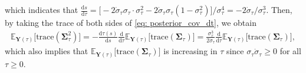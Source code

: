 \documentclass[11pt]{article}
\newcommand{\mE}{\mathbb{E}}
\newcommand{\bY}{\mathbf{Y}}
\newcommand{\bSimga}{\boldsymbol{\Sigma}}
\newcommand{\intd}{\mathrm{d}}
\begin{document}
which indicates that $\frac{\intd s}{\intd \tau} = \big[-2\dot\sigma_\tau\sigma_\tau\cdot \sigma_\tau^2 - 2\dot\sigma_\tau\sigma_\tau(1 - \sigma_\tau^2)\big]/\sigma_\tau^4 = -2\dot\sigma_\tau/\sigma_\tau^3$. Then, by taking the trace of both sides of \eqref{eq: posterior_cov_dt}, we obtain
\begin{align}\label{eq: posterior_cov_trace_dt}
    \mE_{\bY(\tau)}\big[\text{trace}(\bSimga_\tau^2)\big] = -\frac{\intd \tau(s)}{\intd s}\frac{\intd}{\intd \tau}\mE_{\bY(\tau)}\big[\text{trace}(\bSimga_{\tau})\big] = \frac{\sigma_\tau^3}{2\dot\sigma_\tau}\frac{\intd}{\intd \tau}\mE_{\bY(\tau)}\big[\text{trace}(\bSimga_{\tau})\big],
\end{align}
which also implies that $\mE_{\bY(\tau)}\big[\text{trace}(\bSimga_{\tau})\big]$ is increasing in $\tau$ since $\sigma_\tau\dot\sigma_\tau \ge 0$ for all $\tau\ge 0$.
\end{document}

